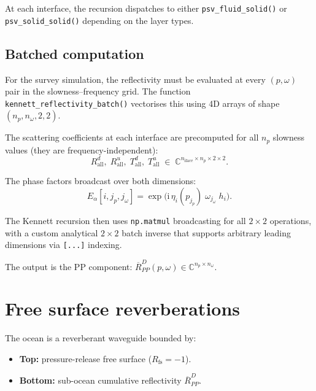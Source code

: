 \documentclass[11pt,a4paper]{article}
\newcommand{\ii}{\mathrm{i}}
\begin{document}
At each interface, the recursion dispatches to either
\texttt{psv\_fluid\_solid()} or \texttt{psv\_solid\_solid()}
depending on the layer types.

\subsection{Batched computation}
\label{sec:batched}

For the survey simulation, the reflectivity must be evaluated
at every $(p, \omega)$ pair in the slowness--frequency grid.
The function \texttt{kennett\_reflectivity\_batch()} vectorises
this using 4D arrays of shape $(n_p, n_\omega, 2, 2)$.

The scattering coefficients at each interface are precomputed
for all $n_p$ slowness values (they are frequency-independent):
\begin{equation}
  R^d_{\text{all}},\;R^u_{\text{all}},\;T^d_{\text{all}},\;T^u_{\text{all}}
  \;\in\;\mathbb{C}^{n_{\text{iface}} \times n_p \times 2 \times 2}.
\end{equation}

The phase factors broadcast over both dimensions:
\begin{equation}
  E_\alpha[i, j_p, j_\omega]
  = \exp\bigl(\ii\,\eta_i(p_{j_p})\;\omega_{j_\omega}\;h_i\bigr).
\end{equation}

The Kennett recursion then uses \texttt{np.matmul} broadcasting
for all $2 \times 2$ operations, with a custom analytical
$2 \times 2$ batch inverse that supports arbitrary leading
dimensions via \texttt{[...]} indexing.

The output is the PP component:
$\overline{R}^D_{PP}(p, \omega) \in \mathbb{C}^{n_p \times n_\omega}$.

\section{Free surface reverberations}
\label{sec:freesurface}

The ocean is a reverberant waveguide bounded by:
\begin{itemize}[nosep]
  \item \textbf{Top:} pressure-release free surface
    ($R_{\text{fs}} = -1$).
  \item \textbf{Bottom:} sub-ocean cumulative reflectivity
    $\overline{R}^D_{PP}$.
\end{itemize}
\end{document}
